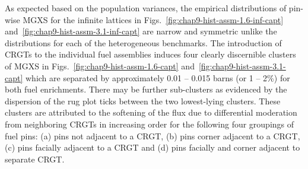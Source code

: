As expected based on the population variances, the empirical distributions of pin-wise \ac{MGXS} for the infinite lattices in Figs.~\ref{fig:chap9-hist-assm-1.6-inf-capt} and~\ref{fig:chap9-hist-assm-3.1-inf-capt} are narrow and symmetric unlike the distributions for each of the heterogeneous benchmarks. The introduction of \acp{CRGT} to the individual fuel assemblies induces four clearly discernible clusters of \ac{MGXS} in Figs.~\ref{fig:chap9-hist-assm-1.6-capt} and~\ref{fig:chap9-hist-assm-3.1-capt} which are separated by approximately 0.01 -- 0.015 barns (or 1 -- 2\%) for both fuel enrichments. There may be further sub-clusters as evidenced by the dispersion of the rug plot ticks between the two lowest-lying clusters. These clusters are attributed to the softening of the flux due to differential moderation from neighboring \acp{CRGT} in increasing order for the following four groupings of fuel pins: (a) pins not adjacent to a \ac{CRGT}, (b) pins corner adjacent to a \ac{CRGT}, (c) pins facially adjacent to a \ac{CRGT} and (d) pins facially and corner adjacent to separate \ac{CRGT}.

